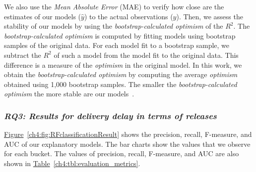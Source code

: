 We also use the \textit{Mean Absolute Error} (MAE) to verify how close are the
estimates of our models ($\hat{y}$) to the actual observations ($y$). Then, we
assess the stability of our models by using the \textit{bootstrap-calculated
optimism} of the $R^2$. The \textit{bootstrap-calculated optimism} is computed
by fitting models using bootstrap samples of the original data. For each model
fit to a bootstrap sample, we subtract the $R^2$ of such a model from the model
fit to the original data. This difference is a measure of the \textit{optimism}
in the original model. In this work, we obtain the \textit{bootstrap-calculated
optimism} by computing the average \textit{optimism} obtained using 1,000
bootstrap samples. The smaller the \textit{bootstrap-calculated optimism} the
more stable are our models~\cite{efron1986biased}.

\subsubsection*{\textit{\textbf{RQ3: Results for delivery delay in terms of
releases}}}

\noindent\DIFdelbegin \textit{\textbf{}%
}
\DIFdelend \DIFaddbegin {}
\DIFaddend \hyperref[ch4:fig:RFclassificationResult]{Figure}~\ref{ch4:fig:RFclassificationResult}
shows the precision, recall, F-measure, and AUC of our explanatory models.  The
bar charts show the values that we observe for each bucket. The values of
precision, recall, F-measure, and AUC are also shown in
\hyperref[ch4:tbl:evaluation_metrics]{Table}~\ref{ch4:tbl:evaluation_metrics}. 

